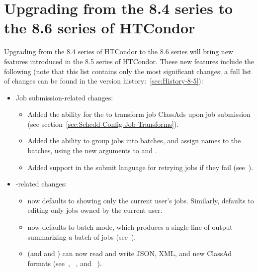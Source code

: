\section{\label{sec:to-8.6}Upgrading from the 8.4 series to the 8.6 series of HTCondor}

Upgrading from the 8.4 series of HTCondor to the 8.6 series
will bring new features introduced in the 8.5 series of HTCondor.
These new features include the following (note that this list contains
only the most significant changes; a full list of changes can be
found in the version history:~\ref{sec:History-8-5}):

\begin{itemize}

\item Job submission-related changes:
  \begin{itemize}

   \item Added the ability for the  to transform
   job ClassAds upon job submission
   (see section~\ref{sec:Schedd-Config-Job-Transforms}).

   \item Added the ability to group jobs into batches, and assign
   names to the batches, using the new  arguments to
    and .

   \item Added support in the submit language for retrying jobs
   if they fail (see~\pageref{condor-submit-max-retries}).

  \end{itemize}

\item {}-related changes:
  \begin{itemize}

  \item {} now defaults to showing only the current user's jobs.
  Similarly,  defaults to editing only jobs owned by the
  current user.  

  \item {} now defaults to batch mode, which produces a single
  line of output summarizing a batch of jobs (see~\pageref{batches-of-jobs}).

  \item {} (and  and ) can now
  read and write JSON, XML, and new ClassAd formats
  (see~\pageref{man-condor-q}, ~\pageref{man-condor-history},
  and ~\pageref{man-condor-status}).


\end{itemize}
\end{itemize}
